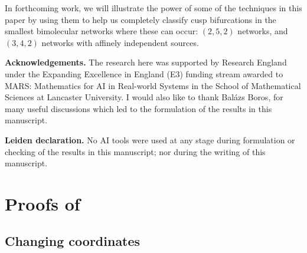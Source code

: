 \documentclass[11pt]{amsart}
\theoremstyle{definition}
\begin{document}
In forthcoming work, we will illustrate the power of some of the techniques in this paper by using them to help us completely classify cusp bifurcations in the smallest bimolecular networks where these can occur: $(2,5,2)$ networks, and $(3,4,2)$ networks with affinely independent sources.


\vskip 5mm
{\bf Acknowledgements.} The research here was supported by Research England under the Expanding Excellence in England (E3) funding stream awarded to MARS: Mathematics for AI in Real-world Systems in the School of Mathematical Sciences at Lancaster University. I would also like to thank Bal\'azs Boros, for many useful discussions which led to the formulation of the results in this manuscript. 

\vskip 5mm
{\bf Leiden declaration.} No AI tools were used at any stage during formulation or checking of the results in this manuscript; nor during the writing of this manuscript. 


\appendix
\section{Proofs of }

\subsection{Changing coordinates} 
\label{app:proofs}
\end{document}

